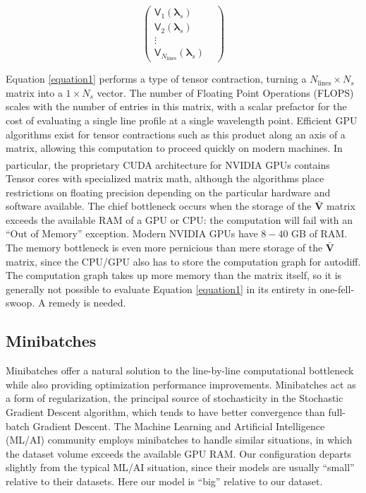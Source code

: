 \documentclass[modern]{aastex631}
\begin{document}
\begin{equation}
  \begin{pmatrix}
    \mathsf{V}_1(\bm{\lambda}_s)                    & \\
    \mathsf{V}_2(\bm{\lambda}_s)                    & \\
    \vdots                                          & \\
    \mathsf{V}_{N_{\mathrm{lines}}}(\bm{\lambda}_s) &
  \end{pmatrix}
\end{equation}

Equation \ref{equation1} performs a type of tensor contraction, turning a $N_{\mathrm{lines}}\times N_{s}$ matrix into a $1\times N_{s}$ vector.  The number of Floating Point Operations (FLOPS) scales with the number of entries in this matrix, with a scalar prefactor for the cost of evaluating a single line profile at a single wavelength point.  Efficient GPU algorithms exist for tensor contractions such as this product along an axis of a matrix, allowing this computation to proceed quickly on modern machines. In particular, the proprietary CUDA architecture for NVIDIA\textsuperscript{\tiny\textregistered} GPUs contains Tensor cores with specialized matrix math, although the algorithms place restrictions on floating precision depending on the particular hardware and software available.  The chief bottleneck occurs when the storage of the $\bm{\bar{V}}$ matrix exceeds the available RAM of a GPU or CPU: the computation will fail with an ``Out of Memory'' exception. Modern NVIDIA GPUs have $8-40$ GB of RAM.  The memory bottleneck is even more pernicious than mere storage of the $\bm{\bar{V}}$ matrix, since the CPU/GPU also has to store the computation graph for autodiff.  The computation graph takes up more memory than the matrix itself, so it is generally not possible to evaluate Equation \ref{equation1} in its entirety in one-fell-swoop.  A remedy is needed.

\subsection{Minibatches}

Minibatches offer a natural solution to the line-by-line computational bottleneck while also providing optimization performance improvements.  Minibatches act as a form of regularization, the principal source of stochasticity in the Stochastic Gradient Descent algorithm, which tends to have better convergence than full-batch Gradient Descent.  The Machine Learning and Artificial Intelligence (ML/AI) community employs minibatches to handle similar situations, in which the dataset volume exceeds the available GPU RAM.  Our configuration departs slightly from the typical ML/AI situation, since their models are usually ``small'' relative to their datasets.  Here our model is ``big'' relative to our dataset.
\end{document}
